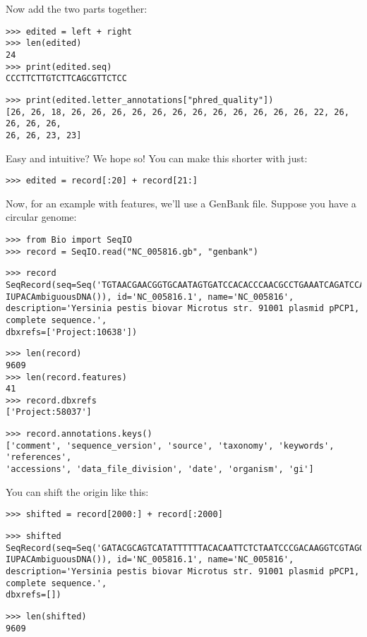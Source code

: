 \noindent Now add the two parts together:

\begin{verbatim}
>>> edited = left + right
>>> len(edited)
24
>>> print(edited.seq)
CCCTTCTTGTCTTCAGCGTTCTCC
\end{verbatim}
\begin{verbatim}
>>> print(edited.letter_annotations["phred_quality"])
[26, 26, 18, 26, 26, 26, 26, 26, 26, 26, 26, 26, 26, 26, 26, 22, 26, 26, 26, 26,
26, 26, 23, 23]
\end{verbatim}

\noindent Easy and intuitive? We hope so! You can make this shorter with just:

\begin{verbatim}
>>> edited = record[:20] + record[21:]
\end{verbatim}

Now, for an example with features, we'll use a GenBank file.
Suppose you have a circular genome:

\begin{verbatim}
>>> from Bio import SeqIO
>>> record = SeqIO.read("NC_005816.gb", "genbank")
\end{verbatim}
\begin{verbatim}
>>> record
SeqRecord(seq=Seq('TGTAACGAACGGTGCAATAGTGATCCACACCCAACGCCTGAAATCAGATCCAGG...CTG',
IUPACAmbiguousDNA()), id='NC_005816.1', name='NC_005816',
description='Yersinia pestis biovar Microtus str. 91001 plasmid pPCP1, complete sequence.',
dbxrefs=['Project:10638'])
\end{verbatim}
\begin{verbatim}
>>> len(record)
9609
>>> len(record.features)
41
>>> record.dbxrefs
['Project:58037']
\end{verbatim}
\begin{verbatim}
>>> record.annotations.keys()
['comment', 'sequence_version', 'source', 'taxonomy', 'keywords', 'references',
'accessions', 'data_file_division', 'date', 'organism', 'gi']
\end{verbatim}

You can shift the origin like this:

\begin{verbatim}
>>> shifted = record[2000:] + record[:2000]
\end{verbatim}
\begin{verbatim}
>>> shifted
SeqRecord(seq=Seq('GATACGCAGTCATATTTTTTACACAATTCTCTAATCCCGACAAGGTCGTAGGTC...GGA',
IUPACAmbiguousDNA()), id='NC_005816.1', name='NC_005816',
description='Yersinia pestis biovar Microtus str. 91001 plasmid pPCP1, complete sequence.',
dbxrefs=[])
\end{verbatim}
\begin{verbatim}
>>> len(shifted)
9609
\end{verbatim}

